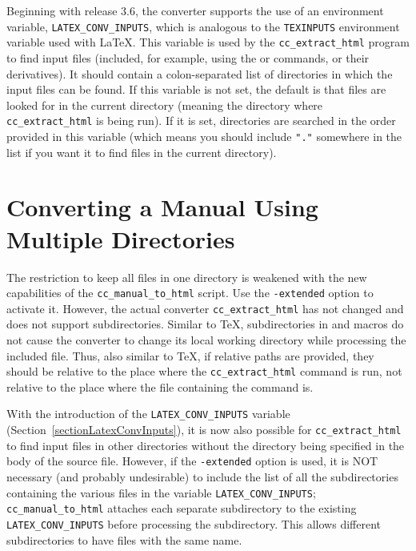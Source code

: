 \documentclass[11pt]{article}
\makeatletter
\newcommand{\Mindex}[1]{\index{#1@\protect\Backslash{\tt #1}}}
\makeatother
\begin{document}
Beginning with release 3.6, the converter supports the use of an 
environment variable, \verb|LATEX_CONV_INPUTS|, which is analogous
to the \verb|TEXINPUTS| environment variable used with \LaTeX.  This
variable is used by the \verb|cc_extract_html| program to find input
files (included, for example, using the \verb|| or \verb|| 
commands, or their derivatives).  It should contain a colon-separated
list of directories in which the input files can be found.  If this variable
is not set, the default is that files are looked for in the current
directory (meaning the directory where \verb|cc_extract_html| is being
run).  If it is set, directories 
are searched in the order provided in this variable (which means you should
include \verb|"."| somewhere in the list if you want it to find files in the
current directory).
\Mindex{input}\Mindex{include}

\section{Converting a Manual Using Multiple Directories}
\label{sectionHtmlExtended}


The restriction to keep all files in one directory is weakened with
the new capabilities of the {\tt cc\_manual\_to\_html} script. Use the
{\tt -extended} option to activate it. However, the actual converter
{\tt cc\_extract\_html} has not changed and does not support
subdirectories. Similar to \TeX, subdirectories in \verb++ and
\verb++ macros do not cause the converter to change its
local working directory while processing the included file.  Thus,
also similar to \TeX, if relative paths are provided, they should be
relative to the place where the {\tt cc\_extract\_html} command is
run, not relative to the place where the file containing the command
is.  

With the introduction of the {\tt LATEX\_CONV\_INPUTS} variable 
(Section~\ref{sectionLatexConvInputs}), it is now also possible 
for {\tt cc\_extract\_html} to find input files in other directories 
without the directory being specified in the body of the source file.  
However, if the {\tt -extended} option is used, it is NOT 
necessary (and probably undesirable) to include the list of all the
subdirectories containing the various files in the variable 
{\tt LATEX\_CONV\_INPUTS}; {\tt cc\_manual\_to\_html} attaches each
separate subdirectory to the existing {\tt LATEX\_CONV\_INPUTS} before 
processing the subdirectory.  This allows different subdirectories 
to have files with the same name. 
\end{document}
